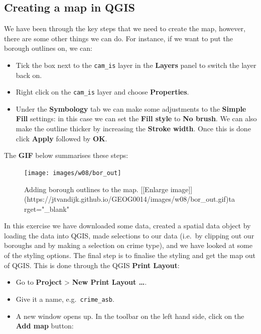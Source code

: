 \documentclass[
]{book}
\providecommand{\tightlist}{%
  \setlength{\itemsep}{0pt}\setlength{\parskip}{0pt}}
\begin{document}
\hypertarget{creating-a-map-in-qgis}{%
\subsection*{Creating a map in QGIS}\label{creating-a-map-in-qgis}}

We have been through the key steps that we need to create the map, however, there are some other things we can do. For instance, if we want to put the borough outlines on, we can:

\begin{itemize}
\tightlist
\item
  Tick the box next to the \texttt{cam\_is} layer in the \textbf{Layers} panel to switch the layer back on.
\item
  Right click on the \texttt{cam\_is} layer and choose \textbf{Properties}.
\item
  Under the \textbf{Symbology} tab we can make some adjustments to the \textbf{Simple Fill} settings: in this case we can set the \textbf{Fill style} to \textbf{No brush}. We can also make the outline thicker by increasing the \textbf{Stroke width}. Once this is done click \textbf{Apply} followed by \textbf{OK}.
\end{itemize}

The \textbf{GIF} below summarises these steps:

\begin{figure}

{\centering \texttt{[image: images/w08/bor\_out]} 

}

\caption{Adding borough outlines to the map. [[Enlarge image]](https://jtvandijk.github.io/GEOG0014/images/w08/bor_out.gif){target="_blank"}}\label{fig:bor-out}
\end{figure}

In this exercise we have downloaded some data, created a spatial data object by loading the data into QGIS, made selections to our data (i.e.~by clipping out our boroughs and by making a selection on crime type), and we have looked at some of the styling options. The final step is to finalise the styling and get the map out of QGIS. This is done through the QGIS \textbf{Print Layout}:

\begin{itemize}
\tightlist
\item
  Go to \textbf{Project} \textgreater{} \textbf{New Print Layout \ldots{}}.
\item
  Give it a name, e.g.~\texttt{crime\_asb}.
\item
  A new window opens up. In the toolbar on the left hand side, click on the \textbf{Add map} button:
\end{itemize}
\end{document}
